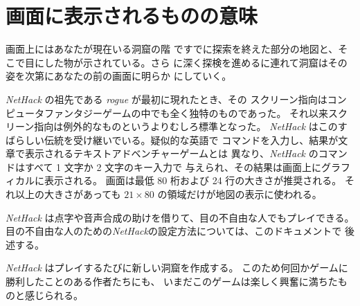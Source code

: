 \section{画面に表示されるものの意味}
画面上にはあなたが現在いる洞窟の階
ですでに探索を終えた部分の地図と、そこで目にした物が示されている。さら
に深く探検を進めるに連れて洞窟はその姿を次第にあなたの前の画面に明らか
にしていく。

{\it NetHack\/} の祖先である {\it rogue\/} が最初に現れたとき、その
スクリーン指向はコンピュータファンタジーゲームの中でも全く独特のものであった。
それ以来スクリーン指向は例外的なものというよりむしろ標準となった。
{\it NetHack\/} はこのすばらしい伝統を受け継いでいる。疑似的な英語で
コマンドを入力し、結果が文章で表示されるテキストアドベンチャーゲームとは
異なり、{\it NetHack\/} のコマンドはすべて 1 文字か 2 文字のキー入力で
与えられ、その結果は画面上にグラフィカルに表示される。
画面は最低 80 桁および 24 行の大きさが推奨される。
それ以上の大きさがあっても $21\times80$ の領域だけが地図の表示に使われる。

{\it NetHack\/} は点字や音声合成の助けを借りて、目の不自由な人でもプレイできる。
目の不自由な人のための{\it NetHack\/}の設定方法については、このドキュメントで
後述する。

{\it NetHack\/} はプレイするたびに新しい洞窟を作成する。
このため何回かゲームに勝利したことのある作者たちにも、
いまだこのゲームは楽しく興奮に満ちたものと感じられる。

